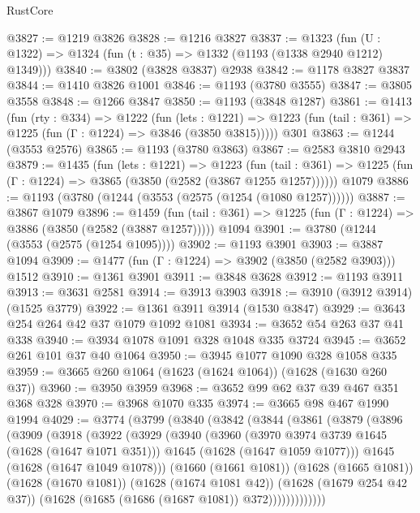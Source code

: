 \begin{lexlean}{RustCore}
\begin{coremodule}
@3827 := @1219 @3826
@3828 := @1216 @3827
@3837 := @1323 (fun (U : @1322) => @1324 (fun (t : @35) => @1332 (@1193 (@1338 @2940 @1212) @1349)))
@3840 := @3802 (@3828 @3837) @2938
@3842 := @1178 @3827 @3837
@3844 := @1410 @3826 @1001
@3846 := @1193 (@3780 @3555)
@3847 := @3805 @3558
@3848 := @1266 @3847
@3850 := @1193 (@3848 @1287)
@3861 := @1413
    (fun (rty : @334) =>
    @1222
      (fun (lets : @1221) =>
      @1223 (fun (tail : @361) => @1225 (fun (Γ : @1224) => @3846 (@3850 @3815)))))
    @301
@3863 := @1244 (@3553 @2576)
@3865 := @1193 (@3780 @3863)
@3867 := @2583 @3810 @2943
@3879 := @1435
    (fun (lets : @1221) =>
    @1223
      (fun (tail : @361) => @1225 (fun (Γ : @1224) => @3865 (@3850 (@2582 (@3867 @1255 @1257))))))
    @1079
@3886 := @1193 (@3780 (@1244 (@3553 (@2575 (@1254 (@1080 @1257))))))
@3887 := @3867 @1079
@3896 := @1459
    (fun (tail : @361) => @1225 (fun (Γ : @1224) => @3886 (@3850 (@2582 (@3887 @1257)))))
    @1094
@3901 := @3780 (@1244 (@3553 (@2575 (@1254 @1095))))
@3902 := @1193 @3901
@3903 := @3887 @1094
@3909 := @1477 (fun (Γ : @1224) => @3902 (@3850 (@2582 @3903))) @1512
@3910 := @1361 @3901
@3911 := @3848 @3628
@3912 := @1193 @3911
@3913 := @3631 @2581
@3914 := @3913 @3903
@3918 := @3910 (@3912 @3914) (@1525 @3779)
@3922 := @1361 @3911 @3914 (@1530 @3847)
@3929 := @3643 @254 @264 @42 @37 @1079 @1092 @1081
@3934 := @3652 @54 @263 @37 @41 @338
@3940 := @3934 @1078 @1091 @328 @1048 @335 @3724
@3945 := @3652 @261 @101 @37 @40 @1064
@3950 := @3945 @1077 @1090 @328 @1058 @335
@3959 := @3665 @260 @1064 (@1623 (@1624 @1064)) (@1628 (@1630 @260 @37))
@3960 := @3950 @3959
@3968 := @3652 @99 @62 @37 @39 @467 @351 @368 @328
@3970 := @3968 @1070 @335
@3974 := @3665 @98 @467 @1990 @1994
@4029 := @3774
    (@3799
      (@3840
        (@3842
          (@3844
            (@3861
              (@3879
                (@3896
                  (@3909
                    (@3918
                      (@3922
                        (@3929
                          (@3940
                            (@3960
                              (@3970 @3974 @3739 @1645 (@1628 (@1647 @1071 @351)))
                              @1645
                              (@1628 (@1647 @1059 @1077)))
                            @1645
                            (@1628 (@1647 @1049 @1078)))
                          (@1660 (@1661 @1081))
                          (@1628 (@1665 @1081))
                          (@1628 (@1670 @1081))
                          (@1628 (@1674 @1081 @42))
                          (@1628 (@1679 @254 @42 @37))
                          (@1628 (@1685 (@1686 (@1687 @1081)) @372)))))))))))))

\end{coremodule}
\end{lexlean}
